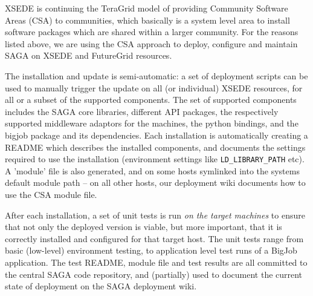 \documentclass{sig-alternate}
\begin{document}
 XSEDE is continuing the TeraGrid model of providing Community
 Software Areas (CSA) to communities, which basically is a system
 level area to install software packages which are shared within a
 larger community.  For the reasons listed above, we are using the CSA
 approach to deploy, configure and maintain SAGA on XSEDE and
 FutureGrid resources.

 The installation and update is semi-automatic: a set of deployment
 scripts can be used to manually trigger the update on all (or
 individual) XSEDE resources, for all or a subset of the supported
 components.  The set of supported components includes the SAGA core
 libraries, different API packages, the respectively supported
 middleware adaptors for the machines, the python bindings, and the
 bigjob package and its dependencies.  Each installation is
 automatically creating a README which describes the installed
 components, and documents the settings required to use the
 installation (environment settings like \texttt{LD\_LIBRARY\_PATH} etc).  A
 'module' file is also generated, and on some hosts symlinked into the
 systems default module path -- on all other hosts, our deployment
 wiki documents how to use the CSA module file.

 After each installation, a set of unit tests is run \textit{on the
 target machines} to ensure that not only the deployed version is
 viable, but more important, that it is correctly installed and
 configured for that target host.  The unit tests range from basic
 (low-level) environment testing, to application level test runs of a
 BigJob application.  The test README, module file and test results
 are all committed to the central SAGA code repository, and
 (partially) used to document the current state of deployment on the
 SAGA deployment wiki.

\end{document}
